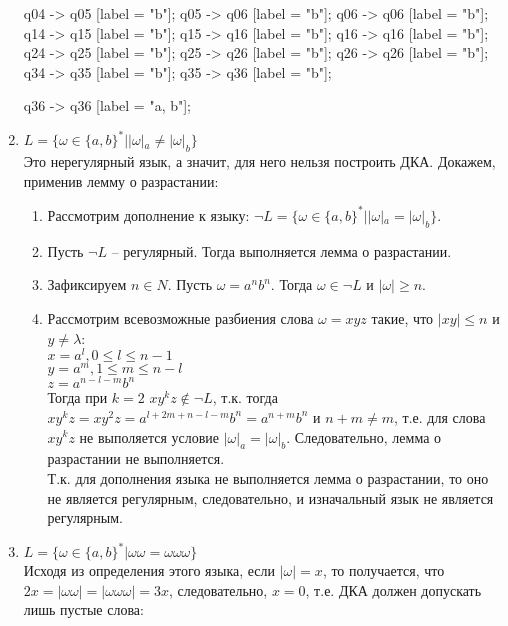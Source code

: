 \documentclass{article}
\begin{document}
\begin{enumerate}
\begin{center}
{        q04 -> q05 [label = "b"];
        q05 -> q06 [label = "b"];
        q06 -> q06 [label = "b"];
        q14 -> q15 [label = "b"];
        q15 -> q16 [label = "b"];
        q16 -> q16 [label = "b"];
        q24 -> q25 [label = "b"];
        q25 -> q26 [label = "b"];
        q26 -> q26 [label = "b"];
        q34 -> q35 [label = "b"];
        q35 -> q36 [label = "b"];
        
        q36 -> q36 [label = "a, b"];
    }
    \end{center}
    
    \item \(L = \{\omega \in \{a,b\}^*||\omega|_a \neq |\omega|_b \}\) \\
        Это нерегулярный язык, а значит, для него нельзя построить ДКА. Докажем, применив лемму о разрастании:
    \begin{enumerate}
        \item Рассмотрим дополнение к языку: \(\neg L = \{\omega \in \{a,b\}^*||\omega|_a = |\omega|_b \}\).
        \item Пусть \(\neg L\) – регулярный. Тогда выполняется лемма о разрастании.
        \item Зафиксируем \(n \in N\). Пусть \(\omega = a^{n}b^{n}\). Тогда \(\omega \in \neg L\) и \(|\omega| \geq n\).
        \item Рассмотрим всевозможные разбиения слова \(\omega = xyz\) такие, что \(|xy| \leq n\) и \(y \neq \lambda\):\\
        \(x = a^{l}, 0 \leq l \leq n - 1\)\\
        \(y = a^{m}, 1 \leq m \leq n - l\)\\
        \(z = a^{n - l - m}b^{n}\)\\
        Тогда при \(k = 2\) \(xy^{k}z \notin \neg L\), т.к. тогда \(xy^{k}z = xy^{2}z = a^{l + 2m + n - l - m}b^{n} = a^{n + m}b^{n}\) и \(n + m \neq m\), т.е. для слова \(xy^{k}z\) не выполяется условие \(|\omega|_a = |\omega|_b\). Следовательно, лемма о разрастании не выполняется.\\
        Т.к. для дополнения языка не выполняется лемма о разрастании, то оно не является регулярным, следовательно, и изначальный язык не является регулярным.
    \end{enumerate}
        
    
    \item \(L = \{\omega \in \{a,b\}^* | \omega \omega = \omega \omega \omega \} \) \\
        Исходя из определения этого языка, если $|\omega| = x$, то получается, что $2x = |\omega \omega| = |\omega \omega \omega| = 3x$, следовательно, $x = 0$, т.е. ДКА должен допускать лишь пустые слова:
    \begin{center}
    \end{center}
\end{enumerate}
\end{document}
